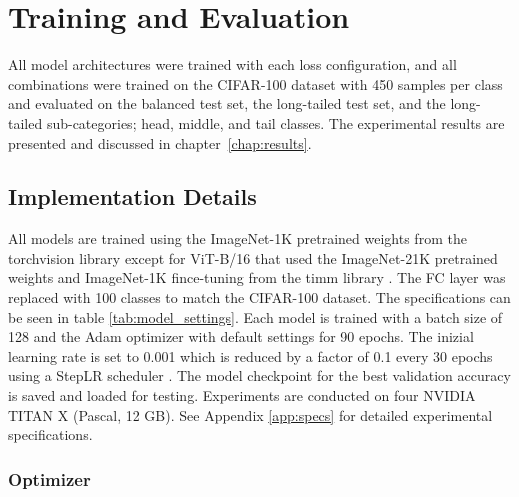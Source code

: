 \section{Training and Evaluation}

All model architectures were trained with each loss configuration, and all combinations were trained on the CIFAR-100 dataset with 450 samples per class and evaluated on the balanced test set, the long-tailed test set, and the long-tailed sub-categories; head, middle, and tail classes. The experimental results are presented and discussed in chapter~\ref{chap:results}.

\subsection{Implementation Details}
All models are trained using the ImageNet-1K pretrained weights from the torchvision library \cite{torchvision-resnet,pytorch_mobilenetv2,torchvision2024convnextbase} except for ViT-B/16 that used the ImageNet-21K pretrained weights and ImageNet-1K fince-tuning from the timm library \cite{huggingface2024vitbase}. The FC layer was replaced with 100 classes to match the CIFAR-100 dataset. The specifications can be seen in table \ref{tab:model_settings}. Each model is trained with a batch size of 128 and the Adam optimizer \cite{kingma2017adammethodstochasticoptimization} with default settings for 90 epochs. The inizial learning rate is set to 0.001 which is reduced by a factor of 0.1 every 30 epochs using a StepLR scheduler \cite{pytorch_steplr}. The model checkpoint for the best validation accuracy is saved and loaded for testing. Experiments are conducted on four NVIDIA TITAN X (Pascal, 12 GB). See Appendix \ref{app:specs} for detailed experimental specifications.

\subsubsection{Optimizer}

